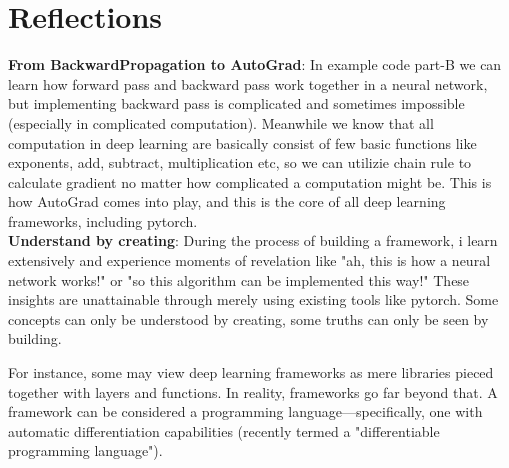 \documentclass{article}
\newcommand{\secs}[1]{\section*{#1}}
\begin{document}
\secs{Reflections}
\noindent\textbf{From BackwardPropagation to AutoGrad}: In example code part-B we can learn how forward pass and backward pass work together in a neural network, but implementing backward pass is complicated and sometimes impossible (especially in complicated computation). Meanwhile we know that all computation in deep learning are basically consist of few basic functions like exponents, add, subtract, multiplication etc, so we can utilizie chain rule to calculate gradient no matter how complicated a computation might be. This is how AutoGrad comes into play, and this is the core of  all deep learning frameworks, including pytorch.\\

\noindent\textbf{Understand by creating}: During the process of building a framework, i learn extensively and experience moments of revelation like "ah, this is how a neural network works!" or "so this algorithm can be implemented this way!" These insights are unattainable through merely using existing tools like pytorch. Some concepts can only be understood by creating, some truths can only be seen by building. 

For instance, some may view deep learning frameworks as mere libraries pieced together with layers and functions. In reality, frameworks go far beyond that. A framework can be considered a programming language—specifically, one with automatic differentiation capabilities (recently termed a "differentiable programming language").
















\end{document}
